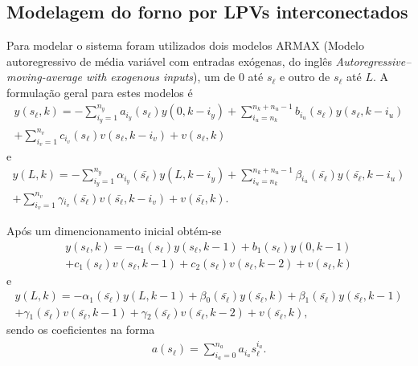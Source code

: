 \subsection{Modelagem do forno por LPVs interconectados}%
\label{subsec:lpv-oven}

Para modelar o sistema foram utilizados dois modelos \ac{ARMAX} (Modelo
autoregressivo de média variável com entradas exógenas, do inglês
\textit{Autoregressive–moving-average with exogenous inputs}), um de \( 0 \) até
\( s_\ell \) e outro de \( s_\ell \) até \( L \). A formulação geral para estes
modelos é
%
\begin{equation}
	\label{eq:lpv-polynom-generic-sl}
	\begin{split}
		y(s_\ell,k) = -\sum_{i_y=1}^{n_y}a_{i_y}(s_\ell)y(0,k-i_y)
		+\sum_{i_u=n_k}^{n_k+n_u-1}b_{i_u}(s_\ell)y(s_\ell,k-i_u) \\
		+\sum_{i_v=1}^{n_v}c_{i_v}(s_\ell)v(s_\ell,k-i_v)+v(s_\ell,k)
	\end{split}
\end{equation}
%
e
%
\begin{equation}
	\label{eq:lpv-polynom-generic-L}
	\begin{split}
		y(L,k) = -\sum_{i_y=1}^{n_y}\alpha{}_{i_y}(\bar{s_\ell})y(L,k-i_y)
		+\sum_{i_u=n_k}^{n_k+n_u-1}\beta{}_{i_u}(\bar{s_\ell})y(\bar{s_\ell},k-i_u) \\
		+\sum_{i_v=1}^{n_v}\gamma{}_{i_v}(\bar{s_\ell})v(\bar{s_\ell},k-i_v)+v(\bar{s_\ell},k).
	\end{split}
\end{equation}

Após um dimencionamento inicial obtém-se
%
\begin{equation}
	\label{eq:lpv-polynom-sl}
	\begin{split}
		y(s_\ell,k) = -a_1(s_\ell)y(s_\ell,k-1) + b_1(s_\ell)y(0,k-1) \\
		+ c_1(s_\ell)v(s_\ell,k-1) + c_2(s_\ell)v(s_\ell,k-2)
		+ v(s_\ell,k)
	\end{split}
\end{equation}
%
e
%
\begin{equation}
	\label{eq:lpv-polynom-L}
	\begin{split}
		y(L,k) = -\alpha{}_1(\bar{s_\ell})y(L,k-1)
		+ \beta{}_0(\bar{s_\ell})y(\bar{s_\ell},k)
		+ \beta{}_1(\bar{s_\ell})y(\bar{s_\ell},k-1) \\
		+ \gamma{}_1(\bar{s_\ell})v(\bar{s_\ell},k-1)
		+ \gamma{}_2(\bar{s_\ell})v(\bar{s_\ell},k-2)
		+ v(\bar{s_\ell},k),
	\end{split}
\end{equation}
%
sendo os coeficientes na forma
%
\begin{equation}
	\label{eq:lpv-coeffs-form}
	\begin{split}
		a(s_\ell)=\sum_{i_a=0}^{n_a}a_{i_a}s_{\ell}^{i_a}.
	\end{split}
\end{equation}

